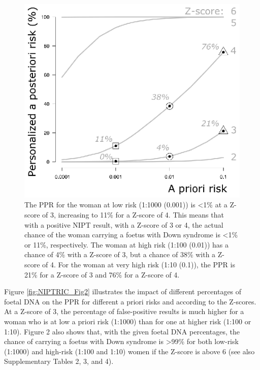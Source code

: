\begin{figure}
	\includegraphics[width=1.0\linewidth]{img/NIPTRIC_Fig1}
	\caption[PPR at low and high risk]{The PPR for the woman at low risk (1:1000 (0.001)) is \textless1\% at a Z-score of 3, increasing to 11\% for a Z-score of 4. This means that with a positive NIPT result, with a Z-score of 3 or 4, the actual chance of the woman carrying a foetus with Down syndrome is \textless1\% or 11\%, respectively. The woman at high risk (1:100 (0.01)) has a chance of 4\% with a Z-score of 3, but a chance of 38\% with a Z-score of 4. For the woman at very high risk (1:10 (0.1)), the PPR is 21\% for a Z-score of 3 and 76\% for a Z-score of 4.}
	\label{fig:NIPTRIC_Fig1}
\end{figure}

Figure \ref{fig:NIPTRIC_Fig2} illustrates the impact of different percentages of foetal DNA on the PPR for different a priori risks and according to the Z-scores. At a Z-score of 3, the percentage of false-positive results is much higher for a woman who is at low a priori risk (1:1000) than for one at higher risk (1:100 or 1:10). Figure 2 also shows that, with the given foetal DNA percentages, the chance of carrying a foetus with Down syndrome is \textgreater99\% for both low-risk (1:1000) and high-risk (1:100 and 1:10) women if the Z-score is above 6 (see also Supplementary Tables 2, 3, and 4).

